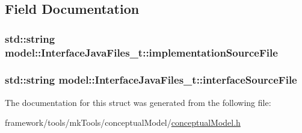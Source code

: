 \subsection{Field Documentation}
\subsubsection[{\texorpdfstring{implementation\+Source\+File}{implementationSourceFile}}]{\setlength{\rightskip}{0pt plus 5cm}std\+::string model\+::\+Interface\+Java\+Files\+\_\+t\+::implementation\+Source\+File}\hypertarget{structmodel_1_1_interface_java_files__t_a36586bfb684e618a1ddaa03a9319fa0f}{}\label{structmodel_1_1_interface_java_files__t_a36586bfb684e618a1ddaa03a9319fa0f}
\subsubsection[{\texorpdfstring{interface\+Source\+File}{interfaceSourceFile}}]{\setlength{\rightskip}{0pt plus 5cm}std\+::string model\+::\+Interface\+Java\+Files\+\_\+t\+::interface\+Source\+File}\hypertarget{structmodel_1_1_interface_java_files__t_a71f5f7da2a0bb3a7288080b3f5c28b81}{}\label{structmodel_1_1_interface_java_files__t_a71f5f7da2a0bb3a7288080b3f5c28b81}


The documentation for this struct was generated from the following file\+:\begin{DoxyCompactItemize}
\item 
framework/tools/mk\+Tools/conceptual\+Model/\hyperlink{conceptual_model_8h}{conceptual\+Model.\+h}\end{DoxyCompactItemize}

